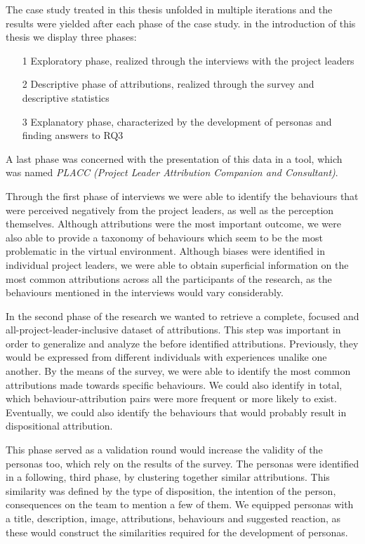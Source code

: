 
The case study treated in this thesis unfolded in multiple iterations and the results were yielded after each phase of the case study.  in the introduction of this thesis we display three phases:
\begin{itemize}
	\item [1] Exploratory phase,  realized through the interviews with the project leaders
	\item [2] Descriptive phase of attributions, realized through the survey and descriptive statistics
	\item [3] Explanatory phase, characterized by the development of personas and finding answers to RQ3
\end{itemize}

A last phase was concerned with the presentation of this data in a tool, which was named \textit{ PLACC (Project Leader Attribution Companion and Consultant)}.

Through the first phase of interviews we were able to identify the behaviours that were perceived negatively from the project leaders, as well as the perception themselves.  Although attributions were the most important outcome, we were also able to provide a taxonomy of behaviours which seem to be the most problematic in the virtual environment. Although biases were identified in individual project leaders, we were able to obtain superficial information on the most common attributions across all the participants of the research, as the behaviours mentioned in the interviews would vary considerably.

In the second phase of the research we wanted to retrieve a complete,  focused and all-project-leader-inclusive dataset of attributions.  This step was important in order to generalize and analyze the before identified attributions.  Previously, they would be expressed from different individuals with experiences unalike one another.  By the means of the survey, we were able to identify the most common attributions made towards specific behaviours.  We could also identify in total, which behaviour-attribution pairs were more frequent or more likely to exist. Eventually, we could also identify the behaviours that would probably result in dispositional attribution. 

This phase served as a validation round would increase the validity of the personas too, which rely on the results of the survey.  The personas were identified in a following, third phase, by clustering together similar attributions. This similarity was defined by the type of disposition, the intention of the person,  consequences on the team to mention a few of them.  We equipped personas with a title, description,  image, attributions, behaviours and suggested reaction, as these would construct the similarities required for the development of personas.

